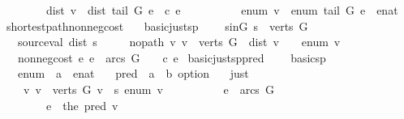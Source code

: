 \begin{isabellebody}
\ \ \ \ \ \ \ \ dist\ v\ {\isacharequal}\ dist\ {\isacharparenleft}tail\ G\ e{\isacharparenright}\ {\isacharplus}\ c\ e\ \ {\isasymand}\isanewline
\ \ \ \ \ \ \ \ enum\ v\ {\isacharequal}\ enum\ {\isacharparenleft}tail\ G\ e{\isacharparenright}\ {\isacharplus}\ {\isacharparenleft}enat\ {}{\isacharparenright}{\isachardoublequoteclose}\isanewline
\isanewline
{}\isamarkupfalse%
\ shortest{\isacharunderscore}path{\isacharunderscore}non{\isacharunderscore}neg{\isacharunderscore}cost\ {\isacharequal}\isanewline
\ \ basic{\isacharunderscore}just{\isacharunderscore}sp\ {\isacharplus}\isanewline
\ \ \ s{\isacharunderscore}in{\isacharunderscore}G{\isacharcolon}\ {\isachardoublequoteopen}s\ {\isasymin}\ verts\ G{\isachardoublequoteclose}\isanewline
\ \ \ source{\isacharunderscore}val{\isacharcolon}\ {\isachardoublequoteopen}dist\ s\ {\isacharequal}\ {}{\isachardoublequoteclose}\isanewline
\ \ \ no{\isacharunderscore}path{\isacharcolon}\ {\isachardoublequoteopen}{\isasymAnd}v{\isachardot}\ v\ {\isasymin}\ verts\ G\ {\isasymLongrightarrow}\ dist\ v\ {\isacharequal}\ {\isasyminfinity}\ {\isasymlongleftrightarrow}\ enum\ v\ {\isacharequal}\ {\isasyminfinity}{\isachardoublequoteclose}\isanewline
\ \ \ non{\isacharunderscore}neg{\isacharunderscore}cost{\isacharcolon}\ {\isachardoublequoteopen}{\isasymAnd}e{\isachardot}\ e\ {\isasymin}\ arcs\ G\ {\isasymLongrightarrow}\ {}\ {\isasymle}\ c\ e{\isachardoublequoteclose}\isanewline
\isanewline
{}\isamarkupfalse%
\ basic{\isacharunderscore}just{\isacharunderscore}sp{\isacharunderscore}pred\ {\isacharequal}\ \isanewline
\ \ basic{\isacharunderscore}sp\ {\isacharplus}\isanewline
\ \ \ enum\ {\isacharcolon}{\isacharcolon}\ {\isachardoublequoteopen}{\isacharprime}a\ {\isasymRightarrow}\ enat{\isachardoublequoteclose}\isanewline
\ \ \ pred\ {\isacharcolon}{\isacharcolon}\ {\isachardoublequoteopen}{\isacharprime}a\ {\isasymRightarrow}\ {\isacharprime}b\ option{\isachardoublequoteclose}\isanewline
\ \ \ just{\isacharcolon}\isanewline
\ \ \ \ {\isachardoublequoteopen}{\isasymAnd}v{\isachardot}\ {\isasymlbrakk}v\ {\isasymin}\ verts\ G{\isacharsemicolon}\ v\ {\isasymnoteq}\ s{\isacharsemicolon}\ enum\ v\ {\isasymnoteq}\ {\isasyminfinity}{\isasymrbrakk}\ {\isasymLongrightarrow}\isanewline
\ \ \ \ \ \ {\isasymexists}\ e\ {\isasymin}\ arcs\ G{\isachardot}\ \isanewline
\ \ \ \ \ \ \ \ e\ {\isacharequal}\ the\ {\isacharparenleft}pred\ v{\isacharparenright}\ {\isasymand}\ \isanewline

\end{isabellebody}
